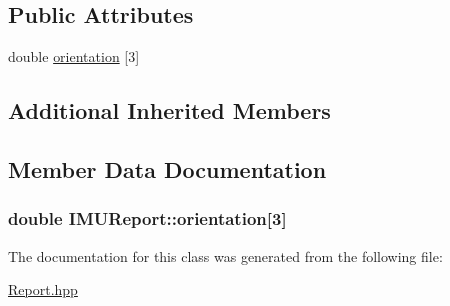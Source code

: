 \subsection*{Public Attributes}
\begin{DoxyCompactItemize}
\item 
double \hyperlink{classIMUReport_a7ec71e96725321584168465be9008387}{orientation} \mbox{[}3\mbox{]}
\end{DoxyCompactItemize}
\subsection*{Additional Inherited Members}


\subsection{Member Data Documentation}
\subsubsection[{\texorpdfstring{orientation}{orientation}}]{\setlength{\rightskip}{0pt plus 5cm}double I\+M\+U\+Report\+::orientation\mbox{[}3\mbox{]}}\hypertarget{classIMUReport_a7ec71e96725321584168465be9008387}{}\label{classIMUReport_a7ec71e96725321584168465be9008387}


The documentation for this class was generated from the following file\+:\begin{DoxyCompactItemize}
\item 
\hyperlink{Report_8hpp}{Report.\+hpp}\end{DoxyCompactItemize}
